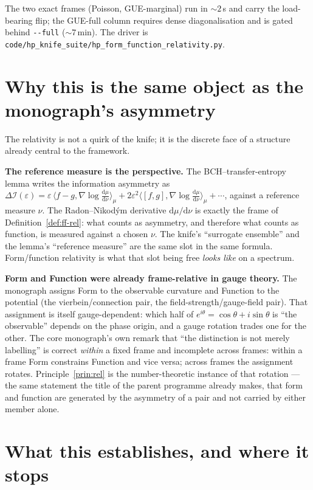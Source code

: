 \documentclass[11pt]{article}
\theoremstyle{definition}
\theoremstyle{plain}
\begin{document}
The two exact frames (Poisson, GUE-marginal) run in $\sim\!2$\,s and carry the load-bearing flip; the GUE-full column requires dense diagonalisation and is gated behind \texttt{-{}-full} ($\sim\!7$\,min). The driver is \nolinkurl{code/hp_knife_suite/hp_form_function_relativity.py}.

\section{Why this is the same object as the monograph's asymmetry}\label{sec:mono}

The relativity is not a quirk of the knife; it is the discrete face of a structure already central to the framework.

\textbf{The reference measure is the perspective.} The BCH--transfer-entropy lemma writes the information asymmetry as $\Delta\mathcal{I}(\varepsilon)=\varepsilon\,\langle f-g,\nabla\log\tfrac{\mathrm{d}\mu}{\mathrm{d}\nu}\rangle_\mu + 2\varepsilon^2\langle[f,g],\nabla\log\tfrac{\mathrm{d}\mu}{\mathrm{d}\nu}\rangle_\mu+\cdots$, against a reference measure $\nu$. The Radon--Nikod\'ym derivative $\mathrm{d}\mu/\mathrm{d}\nu$ is exactly the frame of Definition~\ref{def:ff-rel}: what counts as asymmetry, and therefore what counts as function, is measured against a chosen $\nu$. The knife's ``surrogate ensemble'' and the lemma's ``reference measure'' are the same slot in the same formula. Form/function relativity is what that slot being free \emph{looks like} on a spectrum.

\textbf{Form and Function were already frame-relative in gauge theory.} The monograph assigns Form to the observable curvature and Function to the potential (the vierbein/connection pair, the field-strength/gauge-field pair). That assignment is itself gauge-dependent: which half of $e^{i\theta}=\cos\theta+i\sin\theta$ is ``the observable'' depends on the phase origin, and a gauge rotation trades one for the other. The core monograph's own remark that ``the distinction is not merely labelling'' is correct \emph{within} a fixed frame and incomplete across frames: within a frame Form constrains Function and vice versa; across frames the assignment rotates. Principle~\ref{prin:rel} is the number-theoretic instance of that rotation --- the same statement the title of the parent programme already makes, that form and function are generated by the asymmetry of a pair and not carried by either member alone.

\section{What this establishes, and where it stops}\label{sec:scope}
\end{document}
